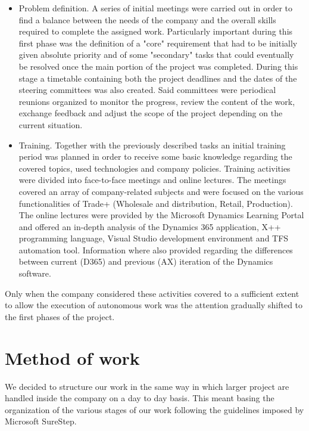 \begin{itemize}
    \item Problem definition. A series of initial meetings were carried out in order to find a balance between the needs of the company and the overall skills required to complete the assigned work. Particularly important during this first phase was the definition of a "core" requirement that had to be initially given absolute priority and of some "secondary" tasks that could eventually be resolved once the main portion of the project was completed. During this stage a timetable containing both the project deadlines and the dates of the steering committees was also created. Said committees were periodical reunions organized to monitor the progress, review the content of the work, exchange feedback and adjust the scope of the project depending on the current situation.
    
    \item Training. Together with the previously described tasks an initial training period was planned in order to receive some basic knowledge regarding the covered topics, used technologies and company policies. Training activities were divided into face-to-face meetings and online lectures. The meetings covered an array of company-related subjects and were focused on the various functionalities of Trade+ (Wholesale and distribution, Retail, Production). The online lectures were provided by the Microsoft Dynamics Learning Portal and offered an in-depth analysis of the Dynamics 365 application, X++ programming language, Visual Studio development environment and TFS automation tool. Information where also provided regarding the differences between current (D365) and previous (AX) iteration of the Dynamics software.
\end{itemize}

Only when the company considered these activities covered to a sufficient extent to allow the execution of autonomous work was the attention gradually shifted to the first phases of the project.

\section{Method of work}

We decided to structure our work in the same way in which larger project are handled inside the company on a day to day basis. This meant basing the organization of the various stages of our work following the guidelines imposed by Microsoft SureStep.

